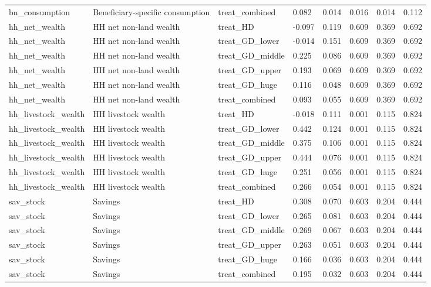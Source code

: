 \begin{tabular}{llllllll}
bn\_consumption & Beneficiary-specific consumption & treat\_combined & 0.082 & 0.014 & 0.016 & 0.014 & 0.112 \\
hh\_net\_wealth & HH net non-land wealth & treat\_HD & -0.097 & 0.119 & 0.609 & 0.369 & 0.692 \\
hh\_net\_wealth & HH net non-land wealth & treat\_GD\_lower & -0.014 & 0.151 & 0.609 & 0.369 & 0.692 \\
hh\_net\_wealth & HH net non-land wealth & treat\_GD\_middle & 0.225 & 0.086 & 0.609 & 0.369 & 0.692 \\
hh\_net\_wealth & HH net non-land wealth & treat\_GD\_upper & 0.193 & 0.069 & 0.609 & 0.369 & 0.692 \\
hh\_net\_wealth & HH net non-land wealth & treat\_GD\_huge & 0.116 & 0.048 & 0.609 & 0.369 & 0.692 \\
hh\_net\_wealth & HH net non-land wealth & treat\_combined & 0.093 & 0.055 & 0.609 & 0.369 & 0.692 \\
hh\_livestock\_wealth & HH livestock wealth & treat\_HD & -0.018 & 0.111 & 0.001 & 0.115 & 0.824 \\
hh\_livestock\_wealth & HH livestock wealth & treat\_GD\_lower & 0.442 & 0.124 & 0.001 & 0.115 & 0.824 \\
hh\_livestock\_wealth & HH livestock wealth & treat\_GD\_middle & 0.375 & 0.106 & 0.001 & 0.115 & 0.824 \\
hh\_livestock\_wealth & HH livestock wealth & treat\_GD\_upper & 0.444 & 0.076 & 0.001 & 0.115 & 0.824 \\
hh\_livestock\_wealth & HH livestock wealth & treat\_GD\_huge & 0.251 & 0.056 & 0.001 & 0.115 & 0.824 \\
hh\_livestock\_wealth & HH livestock wealth & treat\_combined & 0.266 & 0.054 & 0.001 & 0.115 & 0.824 \\
sav\_stock & Savings & treat\_HD & 0.308 & 0.070 & 0.603 & 0.204 & 0.444 \\
sav\_stock & Savings & treat\_GD\_lower & 0.265 & 0.081 & 0.603 & 0.204 & 0.444 \\
sav\_stock & Savings & treat\_GD\_middle & 0.269 & 0.067 & 0.603 & 0.204 & 0.444 \\
sav\_stock & Savings & treat\_GD\_upper & 0.263 & 0.051 & 0.603 & 0.204 & 0.444 \\
sav\_stock & Savings & treat\_GD\_huge & 0.166 & 0.036 & 0.603 & 0.204 & 0.444 \\
sav\_stock & Savings & treat\_combined & 0.195 & 0.032 & 0.603 & 0.204 & 0.444 \\

\end{tabular}
